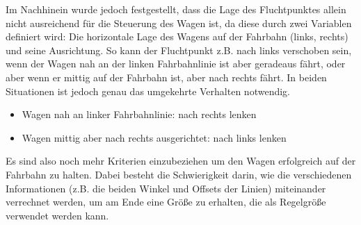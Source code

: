 	Im Nachhinein wurde jedoch festgestellt, dass die Lage des Fluchtpunktes allein nicht ausreichend für die Steuerung des Wagen ist, da diese durch zwei Variablen definiert wird: Die horizontale Lage des Wagens auf der Fahrbahn (links, rechts) und seine Ausrichtung. So kann der Fluchtpunkt z.B. nach links verschoben sein, wenn der Wagen nah an der linken Fahrbahnlinie ist aber geradeaus fährt, oder aber wenn er mittig auf der Fahrbahn ist, aber nach rechts fährt. In beiden Situationen ist jedoch genau das umgekehrte Verhalten notwendig.
	
	\begin{itemize}
		\item Wagen nah an linker Fahrbahnlinie: nach rechts lenken
		\item Wagen mittig aber nach rechts ausgerichtet: nach links lenken
	\end{itemize}

	Es sind also noch mehr Kriterien einzubeziehen um den Wagen erfolgreich auf der Fahrbahn zu halten. Dabei besteht die Schwierigkeit darin, wie die verschiedenen Informationen (z.B. die beiden Winkel und Offsets der Linien) miteinander verrechnet werden, um am Ende eine Größe zu erhalten, die als Regelgröße verwendet werden kann. 
	
	
	
	
